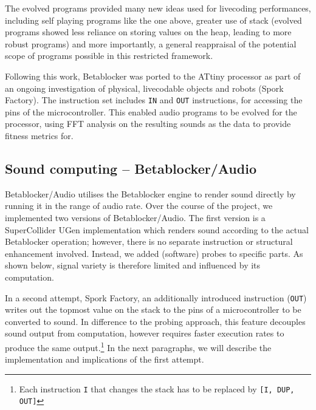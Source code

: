 \documentclass[letterpaper, 12pt]{article}
\begin{document}
The evolved programs provided many new ideas used for livecoding performances,  including self playing programs like the one above, greater use of stack (evolved programs showed less reliance on storing values on the heap, leading to more robust programs) and more importantly, a general reappraisal of the potential scope of programs possible in this restricted framework.

Following this work, Betablocker was ported to the ATtiny processor as part of an ongoing investigation of physical, livecodable objects and robots (Spork Factory). The instruction set includes \texttt{IN} and \texttt{OUT} instructions, for accessing the pins of the microcontroller. This enabled audio programs to be evolved for the processor, using FFT analysis on the resulting sounds as the data to provide fitness metrics for. 

\subsection{Sound computing -- Betablocker/Audio} 
\label{sub:sound_computing}


Betablocker/Audio utilises the Betablocker engine to render sound directly by running it in the range of audio rate.
Over the course of the project, we implemented two versions of Betablocker/Audio.
The first version is a SuperCollider UGen implementation which renders sound according to the actual Betablocker operation; however, there is no separate instruction or structural enhancement involved.
Instead, we added (software) probes to specific parts.
As shown below, signal variety is therefore limited and influenced by its computation.


In a second attempt, Spork Factory, an additionally introduced instruction (\texttt{OUT}) writes out the topmost value on the stack to the pins of a microcontroller to be converted to sound.
In difference to the probing approach, this feature decouples sound output from computation, however requires faster execution rates to produce the same output.\footnote{Each instruction \texttt{I} that changes the stack has to be replaced by \texttt{[I, DUP, OUT]}}
In the next paragraphs, we will describe the implementation and implications of the first attempt.
\end{document}
